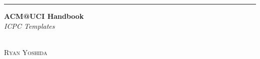 
\begin{titlepage}

    \thispagestyle{empty}
    \raggedleft
    \rule{1pt}{\textheight}
    \hspace{0.05\textwidth}
    \parbox[b]{0.75\textwidth}{
        
        {\Huge\bfseries ACM@UCI Handbook}\\[2\baselineskip]
        {\large\textit{ICPC Templates}}

        \vspace{0.1\textheight}
        
        \\[4\baselineskip]
        {\Large\textsc{Ryan Yoshida}}
    }
\end{titlepage}
